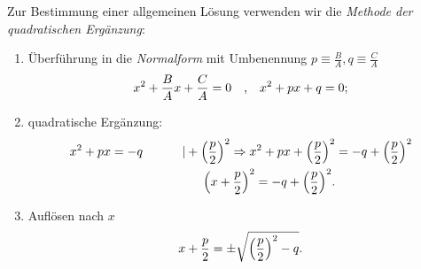 Zur Bestimmung einer allgemeinen Lösung verwenden wir die \emph{Methode der quadratischen Ergänzung}:
\begin{enumerate}
    \item Überführung in die \emph{Normalform} mit Umbenennung $p \equiv \frac{B}{A}, q \equiv \frac{C}{A}$
    \begin{align}
        x^2 + \frac{B}{A} x + \frac{C}{A} = 0\qq{,} x^2 + px + q = 0;
    \end{align}
    \item quadratische Ergänzung: 
    \begin{align}
        x^2 + px = -q \hphantom{+\qty(\frac{p}{2})^2} | +\qty(\frac{p}{2})^2 
        \Rightarrow x^2 + px +\qty(\frac{p}{2})^2 &= -q +\qty(\frac{p}{2})^2 \notag \\
        \qty(x+\frac{p}{2})^2 = - q +\qty(\frac{p}{2})^2.
    \end{align}
    \item Auflösen nach $x$ 
    \begin{align}
        x + \frac{p}{2} = \pm \sqrt{\qty(\frac{p}{2})^2 - q}.
    \end{align}
\end{enumerate}
